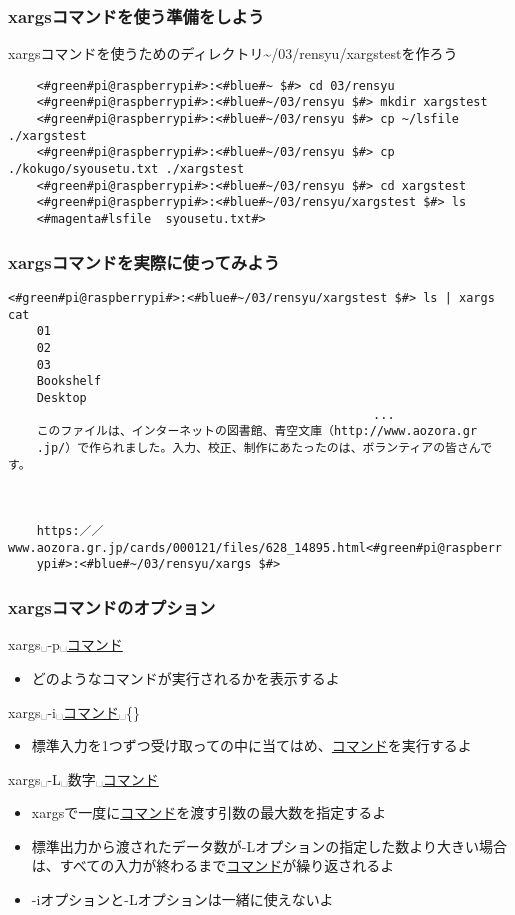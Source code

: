 \begin{frame}[fragile]
    \frametitle{xargsコマンドを使う準備をしよう}
    xargsコマンドを使うためのディレクトリ\textasciitilde/03/rensyu/xargstestを作ろう
    \begin{lstlisting}
    <#green#pi@raspberrypi#>:<#blue#~ $#> cd 03/rensyu
    <#green#pi@raspberrypi#>:<#blue#~/03/rensyu $#> mkdir xargstest
    <#green#pi@raspberrypi#>:<#blue#~/03/rensyu $#> cp ~/lsfile ./xargstest
    <#green#pi@raspberrypi#>:<#blue#~/03/rensyu $#> cp ./kokugo/syousetu.txt ./xargstest
    <#green#pi@raspberrypi#>:<#blue#~/03/rensyu $#> cd xargstest
    <#green#pi@raspberrypi#>:<#blue#~/03/rensyu/xargstest $#> ls
    <#magenta#lsfile  syousetu.txt#>
    \end{lstlisting}
\end{frame}

\begin{frame}[fragile]
    \frametitle{xargsコマンドを実際に使ってみよう}
    \begin{lstlisting}[title=xargsコマンドを使ってcatコマンドを使う]
    <#green#pi@raspberrypi#>:<#blue#~/03/rensyu/xargstest $#> ls | xargs cat
    01
    02
    03
    Bookshelf
    Desktop
                                                   ...
    このファイルは、インターネットの図書館、青空文庫（http://www.aozora.gr
    .jp/）で作られました。入力、校正、制作にあたったのは、ボランティアの皆さんです。
        
        
        
    https:／／www.aozora.gr.jp/cards/000121/files/628_14895.html<#green#pi@raspberr
    ypi#>:<#blue#~/03/rensyu/xargs $#>
    \end{lstlisting}
\end{frame}

\begin{frame}
    \frametitle{xargsコマンドのオプション}
    xargs␣-p␣\underline{コマンド}
    \begin{itemize}
        \item どのようなコマンドが実行されるかを表示するよ
    \end{itemize}
    xargs␣-i␣\underline{コマンド}␣\{\}
    \begin{itemize}
        \item 標準入力を1つずつ受け取って{}の中に当てはめ、\underline{コマンド}を実行するよ
    \end{itemize}
    xargs␣-L␣数字␣\underline{コマンド}
    \begin{itemize}
        \item xargsで一度に\underline{コマンド}を渡す引数の最大数を指定するよ
        \item 標準出力から渡されたデータ数が-Lオプションの指定した数より大きい場合は、すべての入力が終わるまで\underline{コマンド}が繰り返されるよ
        \item -iオプションと-Lオプションは一緒に使えないよ
    \end{itemize}
\end{frame}


